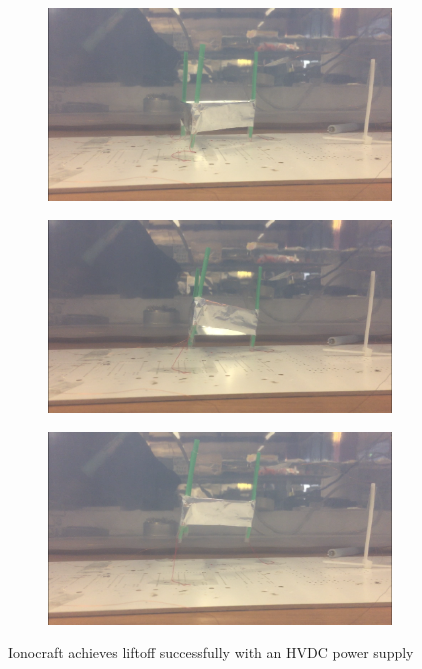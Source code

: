 \documentclass[11pt]{article}
\begin{document}
\begin{figure}[h!]
\centering
\begin{subfigure}{0.49\textwidth}
\centering
\includegraphics[width = \textwidth]{hvdc_1}
\caption{\label{fig:hvdc_1} }
\end{subfigure}
\begin{subfigure}{0.49\textwidth}
\centering
\includegraphics[width = \textwidth]{hvdc_2}
\caption{\label{fig:hvdc_2} }
\end{subfigure}
\begin{subfigure}{0.49\textwidth}
\centering
\includegraphics[width = \textwidth]{hvdc_3}
\caption{\label{fig:hvdc_3} }
\end{subfigure}
\caption{\label{fig:hvdc} Ionocraft achieves liftoff successfully with an HVDC power supply}
\end{figure}
\end{document}
